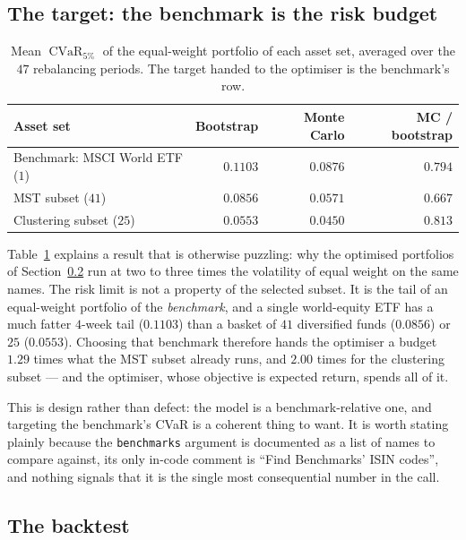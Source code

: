 \documentclass[11pt,a4paper]{article}
\newcommand{\code}[1]{\texttt{#1}}
\DeclareMathOperator{\CVaR}{CVaR}
\begin{document}
\subsection{The target: the benchmark is the risk budget}

\begin{table}[t]
\centering
\caption{Mean $\CVaR_{5\%}$ of the equal-weight portfolio of each asset set,
averaged over the $47$ rebalancing periods. The target handed to the optimiser
is the benchmark's row.}
\label{tab:target}
\begin{tabular}{lrrr}
\toprule
Asset set & Bootstrap & Monte Carlo & MC / bootstrap \\
\midrule
Benchmark: MSCI World ETF ($1$) & $0.1103$ & $0.0876$ & $0.794$ \\
MST subset ($41$)               & $0.0856$ & $0.0571$ & $0.667$ \\
Clustering subset ($25$)        & $0.0553$ & $0.0450$ & $0.813$ \\
\bottomrule
\end{tabular}
\end{table}

Table~\ref{tab:target} explains a result that is otherwise puzzling: why the
optimised portfolios of Section~\ref{sec:backtest} run at two to three times the
volatility of equal weight on the same names. The risk limit is not a property
of the selected subset. It is the tail of an equal-weight portfolio of the
\emph{benchmark}, and a single world-equity ETF has a much fatter $4$-week tail
($0.1103$) than a basket of $41$ diversified funds ($0.0856$) or $25$
($0.0553$). Choosing that benchmark therefore hands the optimiser a budget
$1.29$ times what the MST subset already runs, and $2.00$ times for the
clustering subset --- and the optimiser, whose objective is expected return,
spends all of it.

This is design rather than defect: the model is a benchmark-relative one, and
targeting the benchmark's CVaR is a coherent thing to want. It is worth stating
plainly because the \code{benchmarks} argument is documented as a list of names
to compare against, its only in-code comment is ``Find Benchmarks' ISIN
codes'', and nothing signals that it is the single most consequential number
in the call.

\subsection{The backtest}
\label{sec:backtest}
\end{document}
